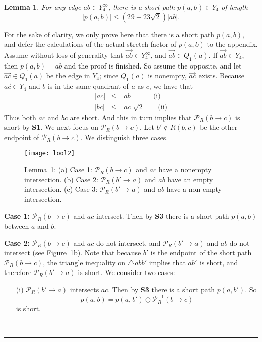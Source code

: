 \pdfoutput=1  \documentclass[11pt]{article}
\newtheorem{lemma}{Lemma}
\newcommand{\qed}{\rule{0.5em}{1.5ex}}
\newcommand{\fqed}{{\hfill~\qed}}
\newenvironment{proof}{{\noindent \bf Proof.}}
                      {{\hfill \fqed} \vspace{1em}}
\newcommand{\Pa}{{\mathcal P}}
\begin{document}
\begin{lemma}
For any edge $ab \in Y_4^\infty$, there is a short path $p(a,b) \in Y_4$ of length
\[|p(a,b)| \le (29 + 23\sqrt{2})|ab|.\]
\label{lem:lool2short}
\end{lemma}
\begin{proof}
For the sake of clarity, we only prove here that there is a short path $p(a,b)$, and defer
the calculations of the actual stretch factor of $p(a,b)$ to the appendix.
Assume without loss of generality that $\overrightarrow{ab} \in Y_4^\infty$, and
$\overrightarrow{ab} \in Q_1(a)$. If $\overrightarrow{ab} \in Y_4$, then $p(a,b) = ab$
and the proof is finished. So assume the opposite, and let
$\overrightarrow{ac} \in Q_1(a)$ be the edge in $Y_4$; since $Q_1(a)$ is nonempty,
$\overrightarrow{ac}$ exists.
Because $\overrightarrow{ac} \in Y_4$ and $b$ is in the same quadrant of $a$
as $c$, we have that
\begin{eqnarray}
\nonumber |ac| & \le & |ab| ~~~~~~~~~~~~~\mbox{(i)}\\
          |bc| & \le & |ac|\sqrt{2}~~~~~~~~~\mbox{(ii)}
\label{eq:o1}
\end{eqnarray}
Thus both $ac$ and $bc$ are short.
And this in turn implies that $\Pa_R(b \rightarrow c)$ is short by {\bf S1}.
We next focus on $\Pa_R(b \rightarrow c)$.
Let $b'\notin R(b,c)$ be the other endpoint of $\Pa_R(b \rightarrow c)$.
We distinguish three cases.

\begin{figure}[hp]
\centering
\texttt{[image: lool2]}
\caption{Lemma~\ref{lem:lool2short}: (a) Case 1: $\Pa_R(b \rightarrow c)$ and $ac$ have a nonempty intersection.
(b) Case 2: $\Pa_R(b' \rightarrow a)$ and $ab$ have an empty intersection.
(c) Case 3: $\Pa_R(b' \rightarrow a)$ and $ab$ have a non-empty intersection.}
\label{fig:lool2}
\end{figure}


\noindent
{\bf Case 1:} $\Pa_R(b \rightarrow c)$ and $ac$ intersect.
Then by {\bf S3} there is a short path $p(a,b)$ between $a$ and $b$.

\medskip
\noindent
{\bf Case 2:} $\Pa_R(b \rightarrow c)$ and $ac$ do not intersect,
and $\Pa_R(b' \rightarrow a)$ and $ab$ do not intersect (see Figure~\ref{fig:lool2}b).
Note that because $b'$ is
the endpoint of the short path $\Pa_R(b \rightarrow c)$, the triangle inequality on $\triangle abb'$
implies that $ab'$ is short, and therefore
$\Pa_R(b' \rightarrow a)$ is short. We consider two cases:
\begin{enumerate}
\item[(i)] $\Pa_R(b' \rightarrow a)$ intersects $ac$.
Then by {\bf S3} there is a short path $p(a,b')$.
So
$$
p(a,b) = p(a,b') \oplus \Pa_R^{-1}(b \rightarrow c)
$$
is short.


\end{enumerate}
\end{proof}
\end{document}
